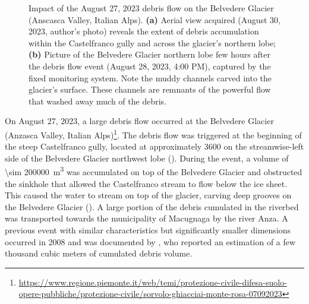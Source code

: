 \begin{figure}[ht!]
    \centering
    \caption{Impact of the August 27, 2023 debris flow on the Belvedere Glacier (Anscasca Valley, Italian Alps). \textbf{(a)} Aerial view acquired (August 30, 2023, author's photo) reveals the extent of debris accumulation within the Castelfranco gully and across the glacier's northern lobe; \textbf{(b)} Picture of the Belvedere Glacier northern lobe few hours after the debris flow event (August 28, 2023, 4:00 PM), captured by the fixed monitoring system. Note the 
    muddy channels carved into the glacier's surface. These channels are remnants of the powerful flow that washed away much of the debris.
    }
    \label{fig:1:belvedere_debris_flow}
\end{figure}

On August 27, 2023, a large debris flow occurred at the Belvedere Glacier (Anzasca Valley, Italian Alps)\footnote{\url{https://www.regione.piemonte.it/web/temi/protezione-civile-difesa-suolo-opere-pubbliche/protezione-civile/sorvolo-ghiacciai-monte-rosa-07092023}}.
The debris flow was triggered at the beginning of the steep Castelfranco gully, located at approximately \SI{3600}{\masl} on the streamwise-left side of the Belvedere Glacier northwest lobe ().
During the event, a volume of \SI{\sim 200000}{\cubic\meter} was accumulated on top of the Belvedere Glacier and obstructed the sinkhole that allowed the Castelfranco stream to flow below the ice sheet. 
This caused the water to stream on top of the glacier, carving deep grooves on the Belvedere Glacier (). 
A large portion of the debris cumulated in the riverbed was transported towards the municipality of Macugnaga by the river Anza.
A previous event with similar characteristics but significantly smaller dimensions occurred in 2008 and was documented by \citet{Mortara2009}, who reported an estimation of a few thousand cubic meters of cumulated debris volume.

